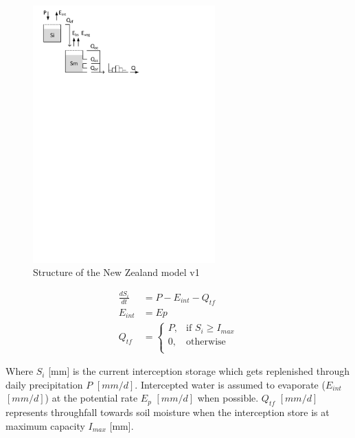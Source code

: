 { 																	%
\begin{figure}
\includegraphics[trim=1cm 22cm 7cm 1cm,width=7cm,keepaspectratio]{./files/16_schematic.pdf}
\caption{Structure of the New Zealand model v1} \label{fig:16_schematic}
\end{figure}

\begin{align}
	\frac{dS_i}{dt} &= P - E_{int} - Q_{tf}\\
	E_{int} &= Ep \\
	Q_{tf} &= \begin{cases}
		P, &\text{if } S_i \geq I_{max}\\
		0, &\text{otherwise}\\
	\end{cases}
\end{align}

Where  $S_i$ [mm] is the current interception storage which gets replenished through daily precipitation $P$ $[mm/d]$. Intercepted water is assumed to evaporate ($E_{int}$ $[mm/d]$) at the potential rate $E_p$ $[mm/d]$ when possible. $Q_{tf}$ $[mm/d]$ represents throughfall towards soil moisture when the interception store is at maximum capacity $I_{max}$ [mm].

} %

